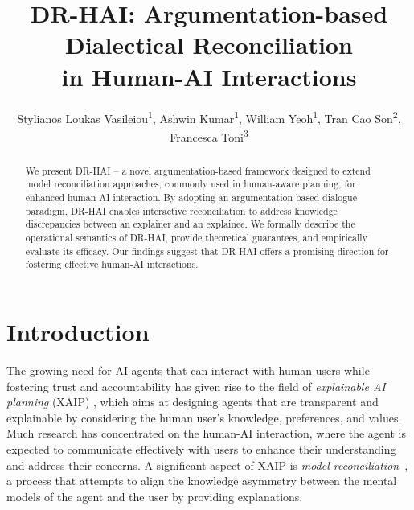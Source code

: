 \documentclass[letterpaper]{article} %
\title{\textsc{DR-HAI}: Argumentation-based Dialectical Reconciliation \\ in Human-AI Interactions}
\author {
  Stylianos Loukas Vasileiou\textsuperscript{\rm 1},
    Ashwin Kumar\textsuperscript{\rm 1},
    William Yeoh\textsuperscript{\rm 1},
   Tran Cao Son\textsuperscript{\rm 2},
   Francesca Toni\textsuperscript{\rm 3}
}
\begin{document}
\maketitle

\begin{abstract}
We present DR-HAI -- a novel argumentation-based framework designed to extend model reconciliation approaches, commonly used in human-aware planning, for enhanced human-AI interaction. By adopting an argumentation-based dialogue paradigm, DR-HAI enables interactive reconciliation to address knowledge discrepancies between an explainer and an explainee. We formally describe the operational semantics of DR-HAI, provide theoretical guarantees, and empirically evaluate its efficacy. Our findings suggest that DR-HAI offers a promising direction for fostering effective human-AI interactions.


\end{abstract}

\setlength{\parskip}{0pt}


\section{Introduction}


The growing need for AI agents that can interact with human users while fostering trust and accountability has given rise to the field of \emph{explainable AI planning} (XAIP) \cite{sreedharan2022explainable}, which aims at designing agents that are transparent and explainable by considering the human user's knowledge, preferences, and values. Much research has concentrated on the human-AI interaction, where the agent is expected to communicate effectively with users to enhance their understanding and address their concerns. A significant aspect of XAIP is \emph{model reconciliation}~\cite{chakraborti2017plan}, a process that attempts to align the knowledge asymmetry between the mental models of the agent and the user by providing explanations.
\end{document}
